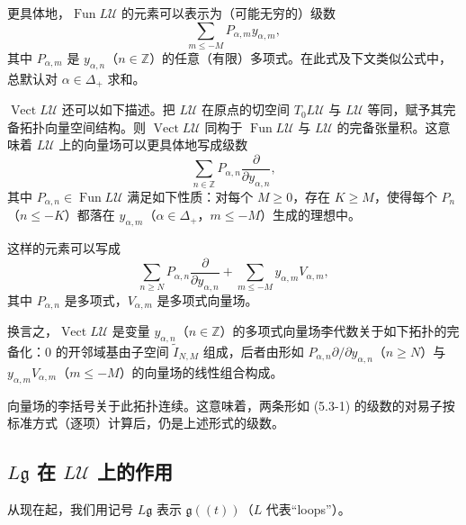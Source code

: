 更具体地，$\operatorname{Fun}L\mathcal{U}$ 的元素可以表示为（可能无穷的）级数
\[
    \sum_{m\le -M}P_{\alpha,m}y_{\alpha,m},
\]
其中 $P_{\alpha,m}$ 是 $y_{\alpha,n}$（$n\in\mathbb{Z}$）的任意（有限）多项式。在此式及下文类似公式中，总默认对 $\alpha\in\Delta_+$ 求和。

$\operatorname{Vect}L\mathcal{U}$ 还可以如下描述。把 $L\mathcal{U}$ 在原点的切空间 $T_0L\mathcal{U}$ 与 $L\mathcal{U}$ 等同，赋予其完备拓扑向量空间结构。则 $\operatorname{Vect}L\mathcal{U}$ 同构于 $\operatorname{Fun}L\mathcal{U}$ 与 $L\mathcal{U}$ 的完备张量积。这意味着 $L\mathcal{U}$ 上的向量场可以更具体地写成级数
\[
    \sum_{n\in\mathbb{Z}}P_{\alpha,n}\frac{\partial}{\partial y_{\alpha,n}},
\]
其中 $P_{\alpha,n}\in\operatorname{Fun}L\mathcal{U}$ 满足如下性质：对每个 $M\ge0$，存在 $K\ge M$，使得每个 $P_n$（$n\le -K$）都落在 $y_{\alpha,m}$（$\alpha\in\Delta_+$，$m\le -M$）生成的理想中。

这样的元素可以写成
\begin{equation}
    \sum_{n\ge N}P_{\alpha,n}\frac{\partial}{\partial y_{\alpha,n}}
    +\sum_{m\le -M}y_{\alpha,m}V_{\alpha,m},
    \tag{5.3-1}
\end{equation}
其中 $P_{\alpha,n}$ 是多项式，$V_{\alpha,m}$ 是多项式向量场。

换言之，$\operatorname{Vect}L\mathcal{U}$ 是变量 $y_{\alpha,n}$（$n\in\mathbb{Z}$）的多项式向量场李代数关于如下拓扑的完备化：$0$ 的开邻域基由子空间 $\widetilde{I}_{N,M}$ 组成，后者由形如 $P_{\alpha,n}\partial/\partial y_{\alpha,n}$（$n\ge N$）与 $y_{\alpha,m}V_{\alpha,m}$（$m\le -M$）的向量场的线性组合构成。

向量场的李括号关于此拓扑连续。这意味着，两条形如 (5.3-1) 的级数的对易子按标准方式（逐项）计算后，仍是上述形式的级数。


\subsection{$L\mathfrak{g}$ 在 $L\mathcal{U}$ 上的作用}

从现在起，我们用记号 $L\mathfrak{g}$ 表示 $\mathfrak{g}((t))$（$L$ 代表“loops”）。

